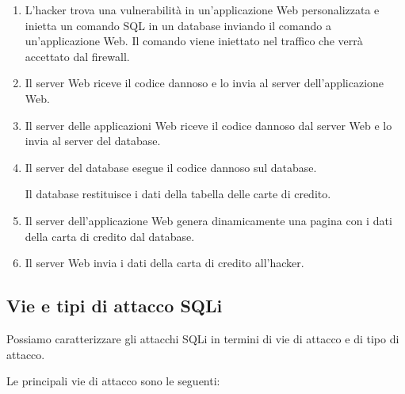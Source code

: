 \begin{enumerate}
    \item L'hacker trova una vulnerabilità in un'applicazione Web personalizzata e inietta un comando SQL in un database inviando il comando a un'applicazione Web. Il comando viene iniettato nel traffico che verrà accettato dal firewall.
    
    \item Il server Web riceve il codice dannoso e lo invia al server dell'applicazione Web.
    
    \item Il server delle applicazioni Web riceve il codice dannoso dal server Web e lo invia al server del database.
    
    \item  Il server del database esegue il codice dannoso sul database.
    
    Il database restituisce i dati della tabella delle carte di credito.
    
    \item  Il server dell'applicazione Web genera dinamicamente una pagina con i dati della carta di credito dal database.
    
    \item  Il server Web invia i dati della carta di credito all'hacker.
\end{enumerate}
\newpage
\subsection{Vie e tipi di attacco SQLi}
Possiamo caratterizzare gli attacchi SQLi in termini di vie di attacco e di tipo di attacco.

\singlespacing

Le principali vie di attacco sono le seguenti:

